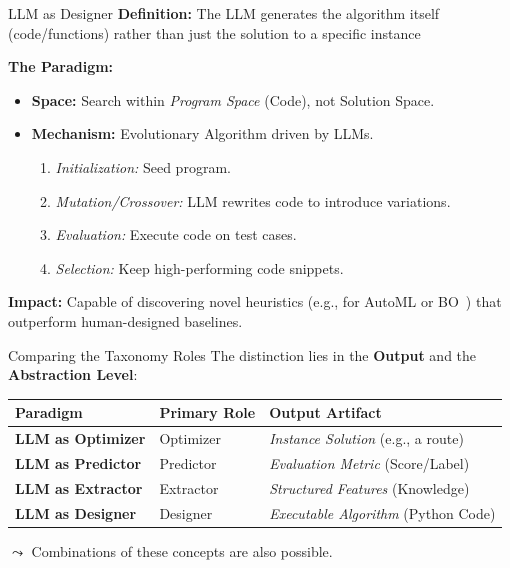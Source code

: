 \documentclass[main]{subfiles}
\begin{document}
\begin{frame}{LLM as Designer}
    \textbf{Definition:} The LLM generates the algorithm itself (code/functions) rather than just the solution to a specific instance 
    
    \vspace{0.5em}
    \textbf{The Paradigm:}
    \begin{itemize}
        \item \textbf{Space:} Search within \textit{Program Space} (Code), not Solution Space.
        \item \textbf{Mechanism:} Evolutionary Algorithm driven by LLMs.
        \begin{enumerate}
            \item \textit{Initialization:} Seed program.
            \item \textit{Mutation/Crossover:} LLM rewrites code to introduce variations.
            \item \textit{Evaluation:} Execute code on test cases.
            \item \textit{Selection:} Keep high-performing code snippets.
        \end{enumerate}
    \end{itemize}
    
    \textbf{Impact:} Capable of discovering novel heuristics (e.g., for AutoML or BO~) that outperform human-designed baselines.
\end{frame}

\begin{frame}{Comparing the Taxonomy Roles}
    The distinction lies in the \textbf{Output} and the \textbf{Abstraction Level}:

    \vspace{1em}
    \begin{table}
        \centering
        \begin{tabular}{lll}
            \toprule
            \textbf{Paradigm} & \textbf{Primary Role} & \textbf{Output Artifact} \\
            \midrule 
            \textbf{LLM as Optimizer} & Optimizer & \textit{Instance Solution} (e.g., a route) \\
            \textbf{LLM as Predictor} & Predictor & \textit{Evaluation Metric} (Score/Label) \\
            \textbf{LLM as Extractor} & Extractor & \textit{Structured Features} (Knowledge) \\
            \textbf{LLM as Designer} & Designer & \textit{Executable Algorithm} (Python Code) \\
            \bottomrule
        \end{tabular}
    \end{table}

    $\leadsto$ Combinations of these concepts are also possible.

\end{frame}
\end{document}
